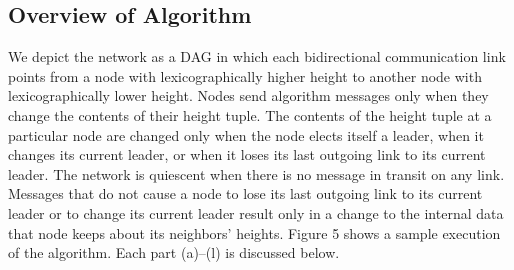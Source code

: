 \documentclass{article}
\begin{document}
\subsection{Overview of Algorithm}
We depict the network as a DAG in which each bidirectional communication link points from a node with lexicographically higher height to another node with lexicographically lower height. Nodes send algorithm messages only when they change the contents of their height tuple. The contents of the height tuple at a particular node are changed only when the node elects itself a leader, when it changes its current leader, or when it loses its last outgoing link to its current leader. The network is quiescent when there is no message in transit on any link. Messages that do not cause a node to lose its last outgoing link to its current leader or to change its current leader result only in a change to the internal data that node keeps about its neighbors’ heights. Figure 5 shows a sample execution of the algorithm. Each part (a)–(l) is discussed below.
\end{document}
